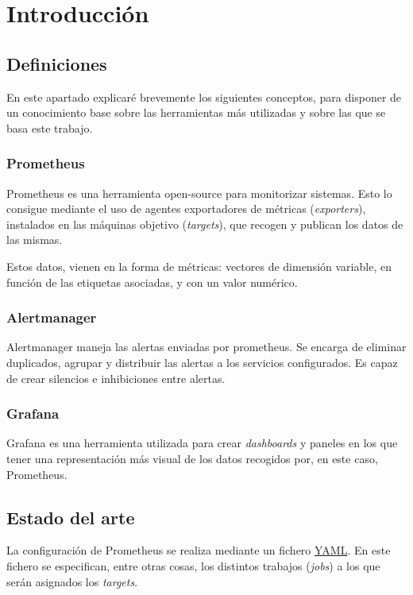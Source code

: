 \chapter{Introducción}
\label{ch:intro}

\section{Definiciones}
En este apartado explicaré brevemente los siguientes conceptos, para disponer de un conocimiento base sobre las herramientas más utilizadas y sobre las que se basa este trabajo.

\subsection*{Prometheus}
Prometheus\cite{prometheus} es una herramienta open-source para monitorizar sistemas. Esto lo consigue mediante el uso de agentes exportadores de métricas (\textit{exporters}), instalados en las máquinas objetivo (\textit{targets}), que recogen y publican los datos de las mismas.

Estos datos, vienen en la forma de métricas: vectores de dimensión variable, en función de las etiquetas asociadas, y con un valor numérico.

\subsection*{Alertmanager}
Alertmanager\cite{alertmanager} maneja las alertas enviadas por prometheus. Se encarga de eliminar duplicados, agrupar y distribuir las alertas a los servicios configurados. Es capaz de crear silencios e inhibiciones entre alertas.

\subsection*{Grafana}
Grafana\cite{grafana} es una herramienta utilizada para crear \textit{dashboards} y paneles en los que tener una representación más visual de los datos recogidos por, en este caso, Prometheus.


\section{Estado del arte}

La configuración de Prometheus se realiza mediante un fichero \url{YAML}. En este fichero se especifican, entre otras cosas, los distintos trabajos (\textit{jobs}) a los que serán asignados los \textit{targets}. 

